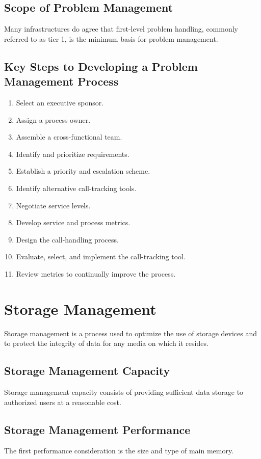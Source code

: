 \documentclass[8pt]{extarticle}
\begin{document}
\begin{multicols}{3}
\subsection{Scope of Problem Management}
Many infrastructures do agree that first-level problem handling, commonly referred to as tier 1,
 is the minimum basis for problem management.

\subsection{Key Steps to Developing a Problem Management Process}
\begin{enumerate}
\item Select an executive sponsor.
\item Assign a process owner.
\item Assemble a cross-functional team.
\item Identify and prioritize requirements.
\item Establish a priority and escalation scheme.
\item Identify alternative call-tracking tools.
\item Negotiate service levels.
\item Develop service and process metrics.
\item Design the call-handling process.
\item Evaluate, select, and implement the call-tracking tool.
\item Review metrics to continually improve the process.
\end{enumerate}

\section{Storage Management}
Storage management is a process used to optimize the use of storage devices and to protect the integrity of data 
for any media on which it resides.

\subsection{Storage Management Capacity}
Storage management capacity consists of providing sufficient data storage to authorized users at a reasonable cost.

\subsection{Storage Management Performance}
The first performance consideration is the size and type of main memory.


\end{multicols}
\end{document}
